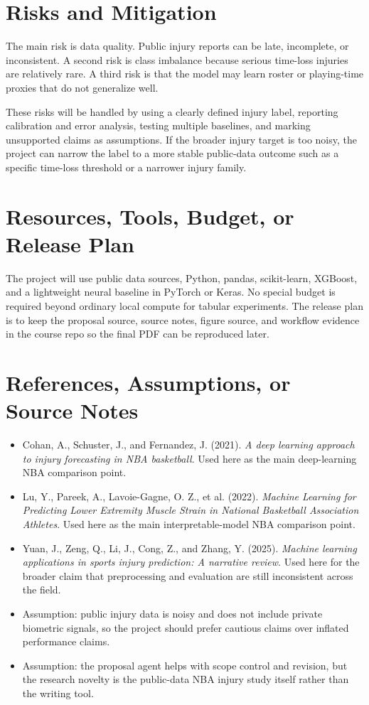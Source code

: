 \documentclass[11pt]{article}
\begin{document}
\section{Risks and Mitigation}
The main risk is data quality. Public injury reports can be late, incomplete, or inconsistent. A second risk is class imbalance because serious time-loss injuries are relatively rare. A third risk is that the model may learn roster or playing-time proxies that do not generalize well.

These risks will be handled by using a clearly defined injury label, reporting calibration and error analysis, testing multiple baselines, and marking unsupported claims as assumptions. If the broader injury target is too noisy, the project can narrow the label to a more stable public-data outcome such as a specific time-loss threshold or a narrower injury family.

\section{Resources, Tools, Budget, or Release Plan}
The project will use public data sources, Python, pandas, scikit-learn, XGBoost, and a lightweight neural baseline in PyTorch or Keras. No special budget is required beyond ordinary local compute for tabular experiments. The release plan is to keep the proposal source, source notes, figure source, and workflow evidence in the course repo so the final PDF can be reproduced later.

\section{References, Assumptions, or Source Notes}
\begin{itemize}
\item Cohan, A., Schuster, J., and Fernandez, J. (2021). \textit{A deep learning approach to injury forecasting in NBA basketball}. Used here as the main deep-learning NBA comparison point.
\item Lu, Y., Pareek, A., Lavoie-Gagne, O. Z., et al. (2022). \textit{Machine Learning for Predicting Lower Extremity Muscle Strain in National Basketball Association Athletes}. Used here as the main interpretable-model NBA comparison point.
\item Yuan, J., Zeng, Q., Li, J., Cong, Z., and Zhang, Y. (2025). \textit{Machine learning applications in sports injury prediction: A narrative review}. Used here for the broader claim that preprocessing and evaluation are still inconsistent across the field.
\item Assumption: public injury data is noisy and does not include private biometric signals, so the project should prefer cautious claims over inflated performance claims.
\item Assumption: the proposal agent helps with scope control and revision, but the research novelty is the public-data NBA injury study itself rather than the writing tool.
\end{itemize}
\end{document}
